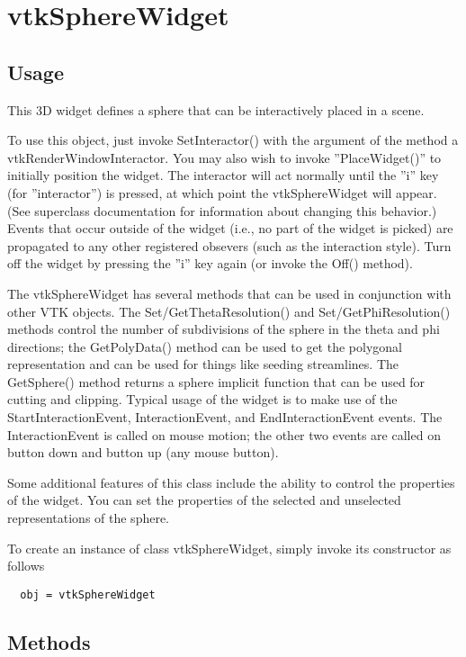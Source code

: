 \section{vtkSphereWidget}

\subsection{Usage}

 This 3D widget defines a sphere that can be interactively placed in a
 scene. 

 To use this object, just invoke SetInteractor() with the argument of the
 method a vtkRenderWindowInteractor.  You may also wish to invoke
 ''PlaceWidget()'' to initially position the widget. The interactor will act
 normally until the ''i'' key (for ''interactor'') is pressed, at which point the
 vtkSphereWidget will appear. (See superclass documentation for information
 about changing this behavior.) 
 Events that occur outside of the widget (i.e., no part of
 the widget is picked) are propagated to any other registered obsevers
 (such as the interaction style).  Turn off the widget by pressing the ''i''
 key again (or invoke the Off() method).

 The vtkSphereWidget has several methods that can be used in conjunction
 with other VTK objects. The Set/GetThetaResolution() and
 Set/GetPhiResolution() methods control the number of subdivisions of the
 sphere in the theta and phi directions; the GetPolyData() method can be
 used to get the polygonal representation and can be used for things like
 seeding streamlines. The GetSphere() method returns a sphere implicit
 function that can be used for cutting and clipping. Typical usage of the
 widget is to make use of the StartInteractionEvent, InteractionEvent, and
 EndInteractionEvent events. The InteractionEvent is called on mouse
 motion; the other two events are called on button down and button up
 (any mouse button).

 Some additional features of this class include the ability to control the
 properties of the widget. You can set the properties of the selected and
 unselected representations of the sphere. 

To create an instance of class vtkSphereWidget, simply
invoke its constructor as follows
\begin{verbatim}
  obj = vtkSphereWidget
\end{verbatim}
\subsection{Methods}

